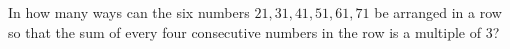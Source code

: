 In how many ways can the six numbers $21,31,41,51,61,71$ be arranged in a row so that the sum of every four consecutive numbers in the row is a multiple of $3$?
